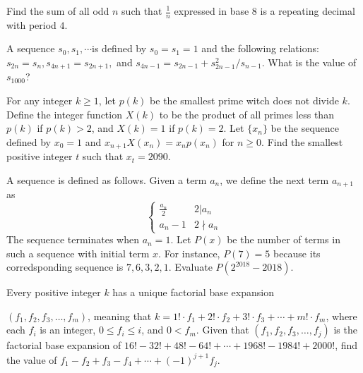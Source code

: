 \documentclass{article}
\begin{document}
\begin{prob}{6}
Find the sum of all odd $n$ such that $\frac{1}{n}$ expressed in base $8$ is a repeating decimal with period $4.$
\end{prob}

\begin{prob}[HMMT 2002]{6}
A sequence $s_0,s_1,\cdots $is defined by $s_0=s_1=1$ and the following relations: $s_{2n}=s_n, s_{4n+1}=s_{2n+1},$ and $s_{4n-1}=s_{2n-1}+s_{2n-1}^2/s_{n-1}$. What is the value of $s_{1000}$?
\end{prob}

\begin{prob}[AIME II 2014/15]{6}
For any integer $k\ge 1$, let $p(k)$ be the smallest prime witch does not divide $k$. Define the integer function $X(k)$ to be the product of all primes less than $p(k)$ if $p(k)>2$, and $X(k)=1$ if $p(k)=2$. Let $\{x_n\}$ be the sequence defined by $x_0=1$ and $x_{n+1}X(x_n)=x_np(x_n)$ for $n\ge 0$. Find the smallest positive integer $t$ such that $x_t=2090$.
\end{prob}

\begin{prob}[SMT 2018]{9}
A sequence is defined as follows. Given a term $a_n$, we define the next term $a_{n+1}$ as \[\begin{cases} 
      \frac{a_n}2 & 2|a_n \\
      a_n-1 & 2\nmid a_n 
   \end{cases}\]The sequence terminates when $a_n=1$. Let $P(x)$ be the number of terms in such a sequence with initial term $x$. For instance, $P(7)=5$ because its corredsponding sequence is $7,6,3,2,1$. Evaluate $P(2^{2018}-2018).$
\end{prob}

\begin{prob}[AIME II 2000/14]{13}
Every positive integer $k$ has a unique factorial base expansion 

$(f_1,f_2,f_3,\ldots,f_m)$, meaning that $k=1!\cdot f_1+2!\cdot f_2+3!\cdot f_3+\cdots+m!\cdot f_m$, where each $f_i$ is an integer, $0\le f_i\le i$, and $0<f_m$. Given that $(f_1,f_2,f_3,\ldots,f_j)$ is the factorial base expansion of $16!-32!+48!-64!+\cdots+1968!-1984!+2000!$, find the value of $f_1-f_2+f_3-f_4+\cdots+(-1)^{j+1}f_j$.
\end{prob}
\end{document}
